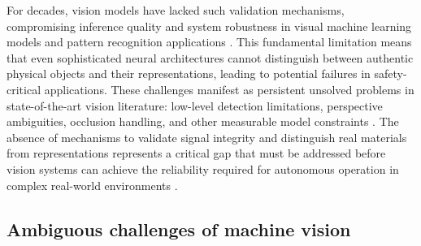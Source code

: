 \documentclass[12pt,a4paper,oneside]{report}
\begin{document}
For decades, vision models have lacked such validation mechanisms, compromising inference quality and system robustness in visual machine learning models and pattern recognition applications \cite{sharan2013,schwartz2013}. This fundamental limitation means that even sophisticated neural architectures cannot distinguish between authentic physical objects and their representations, leading to potential failures in safety-critical applications. These challenges manifest as persistent unsolved problems in state-of-the-art vision literature: low-level detection limitations, perspective ambiguities, occlusion handling, and other measurable model constraints \cite{inagaki2020,edozie2025,depthpro2024}. The absence of mechanisms to validate signal integrity and distinguish real materials from representations represents a critical gap that must be addressed before vision systems can achieve the reliability required for autonomous operation in complex real-world environments \cite{rani2025}.


\vspace{1cm}
\noindent\begin{minipage}{\textwidth}
\setlength{\parindent}{0pt}%
\setlength{\leftskip}{0pt}%
\setlength{\rightskip}{0pt}%
\setlength{\emergencystretch}{3em}%
%
\footnotesize%
\ttfamily%
\color{textgrey}%
\justifying%
\sloppy%
\quotethree
\end{minipage}

\subsection{Ambiguous challenges of machine vision}
\label{subsec:ambiguous_challenges}
\end{document}
